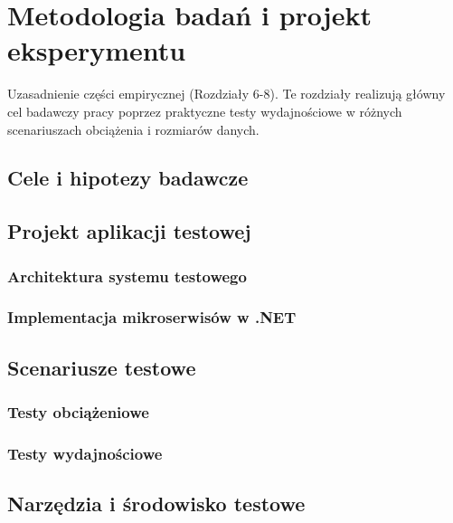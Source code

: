 \cleardoublepage

\chapter{Metodologia badań i projekt eksperymentu}
\label{cha:MetodologiaBadan}

Uzasadnienie części empirycznej (Rozdziały 6-8).
Te rozdziały realizują główny cel badawczy pracy poprzez praktyczne testy wydajnościowe w różnych scenariuszach obciążenia i rozmiarów danych.

\section{Cele i hipotezy badawcze}
\label{sec:CeleHipotezy}

\section{Projekt aplikacji testowej}
\label{sec:ProjektAplikacji}

\subsection{Architektura systemu testowego}
\label{subsec:ArchitekturaTestowa}

\subsection{Implementacja mikroserwisów w .NET}
\label{subsec:ImplementacjaMikroserwisow}

\section{Scenariusze testowe}
\label{sec:ScenariuszeTestowe}

\subsection{Testy obciążeniowe}
\label{subsec:TestyObciazeniowe}

\subsection{Testy wydajnościowe}
\label{subsec:TestyWydajnosciowe}

\section{Narzędzia i środowisko testowe}
\label{sec:NarzedziaTestowe}
